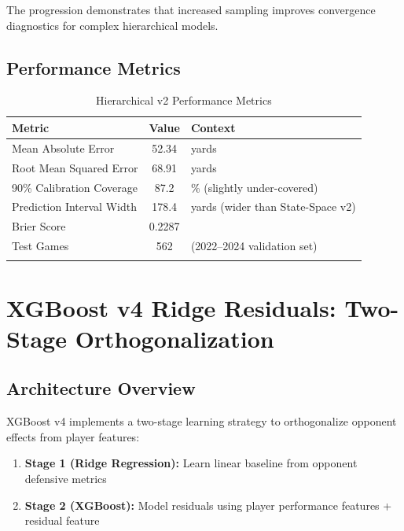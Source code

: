 \noindent The progression demonstrates that increased sampling improves convergence diagnostics for complex hierarchical models.

\subsection{Performance Metrics}

\begin{table}[htbp]
\centering
\caption{Hierarchical v2 Performance Metrics}
\label{tab:hierarchical-performance}
\small
\begin{tabular}{@{} l S[table-format=3.2] l @{}}
\toprule
\textbf{Metric} & \textbf{Value} & \textbf{Context} \\
\midrule
Mean Absolute Error & 52.34 & yards \\
Root Mean Squared Error & 68.91 & yards \\
90\% Calibration Coverage & 87.2 & \% (slightly under-covered) \\
Prediction Interval Width & 178.4 & yards (wider than State-Space v2) \\
Brier Score & 0.2287 & \\
Test Games & 562 & (2022--2024 validation set) \\
\baselinerule
{} \\
\bottomrule
\end{tabular}
\end{table}

\section{XGBoost v4 Ridge Residuals: Two-Stage Orthogonalization}
\label{sec:xgboost-v4-ridge-appendix}

\subsection{Architecture Overview}

XGBoost v4 implements a two-stage learning strategy to orthogonalize opponent effects from player features:

\begin{enumerate}[itemsep=2pt,parsep=0pt]
    \item \textbf{Stage 1 (Ridge Regression):} Learn linear baseline from opponent defensive metrics
    \item \textbf{Stage 2 (XGBoost):} Model residuals using player performance features + residual feature
\end{enumerate}

